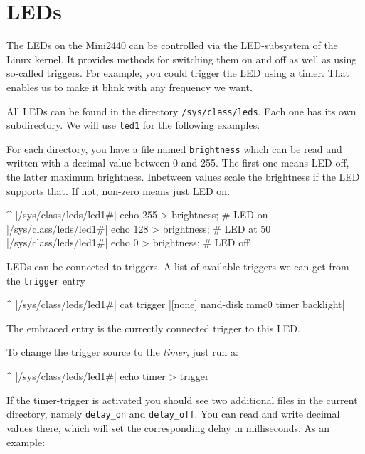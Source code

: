 \newcommand{\perLedName}{led1}
\newcommand{\perAvailableTriggers}{[none] nand-disk mmc0 timer backlight}

\newcommand{\LedPath}{/sys/class/leds/\perLedName\#}

\section{LEDs}				\label{sec:LED}

The LEDs on the Mini2440 can be controlled via the LED-subsystem of the Linux
kernel. It provides methods for switching them on and off as well as using
so-called triggers.  For example, you could trigger the LED using a timer.
That enables us to make it blink with any frequency we want.

All LEDs can be found in the directory \texttt{/sys/class/leds}. Each one has
its own subdirectory. We will use \texttt{\perLedName} for the following
examples.

For each directory, you have a file named \texttt{brightness} which can be read and
written with a decimal value between 0 and 255. The first one means LED off,
the latter maximum brightness. Inbetween values scale the brightness if the LED
supports that. If not, non-zero means just LED on.

\begin{ptxshell}[escapechar=|]{^}
|\LedPath| echo 255 > brightness; # LED on
|\LedPath| echo 128 > brightness; # LED at 50%
|\LedPath| echo 0 > brightness; # LED off
\end{ptxshell}

LEDs can be connected to triggers. A list of available triggers we can get from the
\texttt{trigger} entry

\begin{ptxshell}[escapechar=|]{^}
|\LedPath| cat trigger
|\perAvailableTriggers{}|
\end{ptxshell}

The embraced entry is the currectly connected trigger to this LED.

To change the trigger source to the \textit{timer}, just run a:

\begin{ptxshell}[escapechar=|]{^}
|\LedPath| echo timer > trigger
\end{ptxshell}

If the timer-trigger is activated you should see two additional files in the
current directory, namely \texttt{delay\_on} and \texttt{delay\_off}. You can
read and write decimal values there, which will set the corresponding delay in
milliseconds. As an example:

